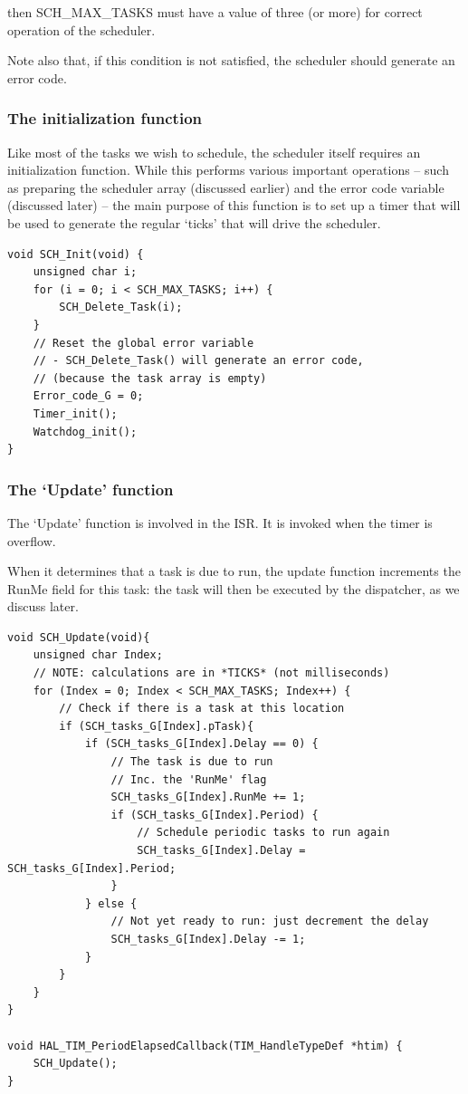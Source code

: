 \documentclass[twoside, final]{hcmut_report}
\begin{document}
then SCH\_MAX\_TASKS must have a value of three (or more) for correct operation of
the scheduler.

Note also that, if this condition is not satisfied, the scheduler should generate an
error code.
\subsubsection{The initialization function}
Like most of the tasks we wish to schedule, the scheduler itself requires an initialization function. While this performs various important operations – such as preparing
the scheduler array (discussed earlier) and the error code variable (discussed later) –
the main purpose of this function is to set up a timer that will be used to generate the
regular ‘ticks’ that will drive the scheduler.

\begin{lstlisting}[basicstyle=\small, caption=Example of how]
void SCH_Init(void) {
    unsigned char i;
    for (i = 0; i < SCH_MAX_TASKS; i++) {
        SCH_Delete_Task(i);
    }
    // Reset the global error variable
    // - SCH_Delete_Task() will generate an error code, 
    // (because the task array is empty)
    Error_code_G = 0;
    Timer_init();
    Watchdog_init();
}
\end{lstlisting}
\subsubsection{The ‘Update’ function}
The ‘Update’ function is involved in the ISR. It is invoked when the timer is overflow.

When it determines that a task is due to run, the update function increments the
RunMe field for this task: the task will then be executed by the dispatcher, as we discuss later.
\begin{lstlisting}[basicstyle=\small, caption=Example of how to write an SCH\_Update function]
void SCH_Update(void){
    unsigned char Index;
    // NOTE: calculations are in *TICKS* (not milliseconds)
    for (Index = 0; Index < SCH_MAX_TASKS; Index++) {
        // Check if there is a task at this location
        if (SCH_tasks_G[Index].pTask){
            if (SCH_tasks_G[Index].Delay == 0) {
                // The task is due to run
                // Inc. the 'RunMe' flag
                SCH_tasks_G[Index].RunMe += 1; 
                if (SCH_tasks_G[Index].Period) {
                    // Schedule periodic tasks to run again
                    SCH_tasks_G[Index].Delay = SCH_tasks_G[Index].Period;
                } 
            } else {
                // Not yet ready to run: just decrement the delay 
                SCH_tasks_G[Index].Delay -= 1;
            }
        } 
    }
}

void HAL_TIM_PeriodElapsedCallback(TIM_HandleTypeDef *htim) {
	SCH_Update();
}

\end{lstlisting}
\end{document}
